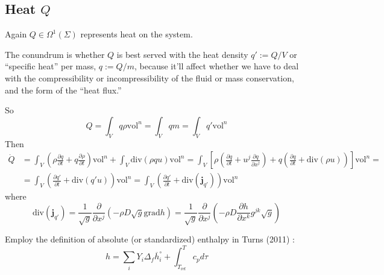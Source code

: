 \documentclass[10pt]{amsart}
\begin{document}
\begin{multicols*}{2}
\subsection{Heat $Q$ }

Again $Q \in \Omega^1(\Sigma)$ represents heat on the system.  

The conundrum is whether $Q$ is best served with the heat density $q':= Q/V$ or ``specific heat'' per mass, $q:= Q/m$, because it'll affect whether we have to deal with the compressibility or incompressibility of the fluid or mass conservation, and the form of the ``heat flux.''

So
\[
Q = \int_V q \rho \text{vol}^n = \int_V qm = \int_V q' \text{vol}^n
\]
Then
\[
\begin{aligned}
  \dot{Q} & = \int_V \left( \rho \frac{ \partial q }{ \partial t} + q \frac{ \partial \rho }{ \partial t} \right) \text{vol}^n + \int_V \text{div}( \rho qu ) \text{vol}^n = \int_V \left[ \rho \left( \frac{ \partial q}{ \partial t} + u^j \frac{ \partial q }{ \partial x^j} \right) + q \left( \frac{ \partial q}{ \partial t} + \text{div}(\rho u) \right) \right] \text{vol}^n = \\
   & = \int_V \left( \frac{ \partial q'}{ \partial t} + \text{div}(q'u) \right) \text{vol}^n = \int_V \left( \frac{ \partial q'}{ \partial t} + \text{div}(\mathbf{j}_{q'}) \right) \text{vol}^n
\end{aligned}
\]
where
\[
\text{div}(\mathbf{j}_{q'} ) = \frac{1}{\sqrt{g}} \frac{ \partial }{ \partial x^j} (- \rho D \sqrt{g} \text{grad}h ) = \frac{1}{\sqrt{g}} \frac{ \partial }{ \partial x^j} (-\rho D \frac{ \partial h}{ \partial x^k} g^{jk} \sqrt{g} )
\]



Employ the definition of absolute (or standardized) enthalpy in Turns (2011) \cite{STurns2011}:
\[
h = \sum_i Y_i \Delta_f \overline{h}_i^{\circ} + \int_{T_{\text{ref}}}^T c_p d\tau
\]


\end{multicols*}
\end{document}
